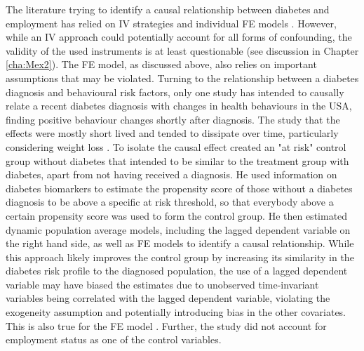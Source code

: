 

The literature trying to identify a causal relationship between diabetes and employment has relied on \ac{IV} strategies \parencite{Brown2005,Latif2009,Seuring2015} and individual \ac{FE} models \parencite{Seuring2016}. However, while an \ac{IV} approach could potentially account for all forms of confounding, the validity of the used instruments is at least questionable (see discussion in Chapter \ref{cha:Mex2}). The \ac{FE} model, as discussed above, also relies on important assumptions that may be violated. Turning to the relationship between a diabetes diagnosis and behavioural risk factors, only one study has intended to causally relate a recent diabetes diagnosis with changes in health behaviours in the USA, finding positive behaviour changes shortly after diagnosis. The study that the effects were mostly short lived and tended to dissipate over time, particularly considering weight loss \parencite{Slade2012}. To isolate the causal effect \textcite{Slade2012} created an "at risk" control group without diabetes that intended to be similar to the treatment group with diabetes, apart from not having received a diagnosis. He used information on diabetes biomarkers to estimate the propensity score of those without a diabetes diagnosis to be above a specific at risk threshold, so that everybody above a certain propensity score was used to form the control group. He then estimated dynamic population average models, including the lagged dependent variable on the right hand side, as well as \ac{FE} models to identify a causal relationship. While this approach likely improves the control group by increasing its similarity in the diabetes risk profile to the diagnosed population, the use of a lagged dependent variable may have biased the estimates due to unobserved time-invariant variables being correlated with the lagged dependent variable, violating the exogeneity assumption and potentially introducing bias in the other covariates. This is also true for the \ac{FE} model \parencite{Nickell1981,Anderson1982}. Further, the study did not account for employment status as one of the control variables. 

